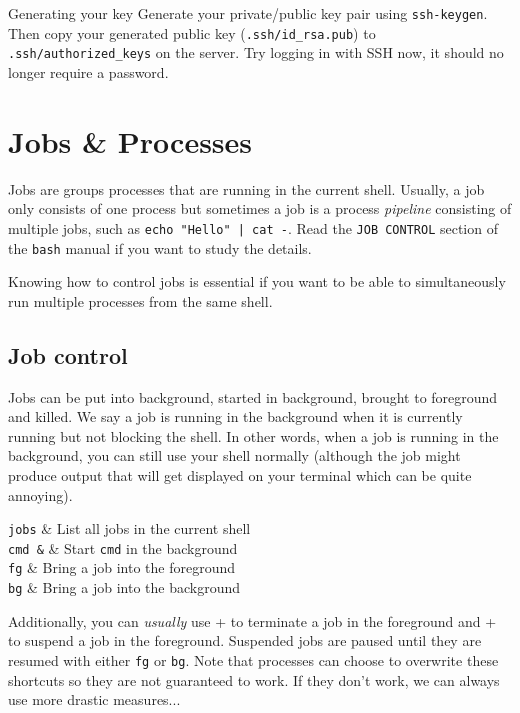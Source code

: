 \documentclass{TheAlternativeCourse}
\begin{document}
\begin{exercisebox}{Generating your key}
    Generate your private/public key pair using \texttt{ssh-keygen}.
    Then copy your generated public key (\texttt{.ssh/id\_rsa.pub}) to
    \texttt{.ssh/authorized\_keys} on the server. Try logging in with SSH now,
    it should no longer require a password.
\end{exercisebox}


\section{Jobs \& Processes}

Jobs are groups processes that are running in the current shell. Usually, a job only consists of one process but sometimes a job is a process \emph{pipeline} consisting of multiple jobs, such as \texttt{echo "Hello" | cat -}. Read the \texttt{JOB CONTROL} section of the \texttt{bash} manual if you want to study the details.

Knowing how to control jobs is essential if you want to be able to simultaneously run multiple processes from the same shell.

\subsection{Job control}

Jobs can be put into background, started in background, brought to foreground and killed. We say a job is running in the background when it is currently running but not blocking the shell. In other words, when a job is running in the background, you can still use your shell normally (although the job might produce output that will get displayed on your terminal which can be quite annoying).

\begin{table}[H]
    \centering
    \begin{tcolorbox}[%
        enhanced,
        fuzzy shadow={1mm}{-1mm}{0mm}{0.1mm}{black!50!white},
        width=1.0\linewidth,
        tabularx={>{\centering\arraybackslash}l|>{\centering\arraybackslash}X},
        title={Working with jobs}]
	    \texttt{jobs} & List all jobs in the current shell\\
	    \texttt{cmd \&} & Start \texttt{cmd} in the background\\
	    \texttt{fg} & Bring a job into the foreground\\
	    \texttt{bg} & Bring a job into the background\\
    \end{tcolorbox}
    \label{tab7}
\end{table}
%
Additionally, you can \emph{usually} use \keys{\ctrl}+ to terminate a job in the foreground and \keys{\ctrl}+ to suspend a job in the foreground. Suspended jobs are paused until they are resumed with either \texttt{fg} or \texttt{bg}. Note that processes can choose to overwrite these shortcuts so they are not guaranteed to work. If they don't work, we can always use more drastic measures...
\end{document}
